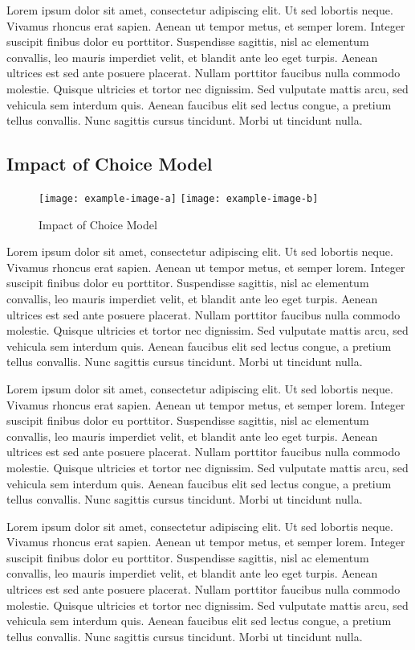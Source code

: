 Lorem ipsum dolor sit amet, consectetur adipiscing elit. Ut sed lobortis neque. Vivamus rhoncus erat sapien. Aenean ut tempor metus, et semper lorem. Integer suscipit finibus dolor eu porttitor. Suspendisse sagittis, nisl ac elementum convallis, leo mauris imperdiet velit, et blandit ante leo eget turpis. Aenean ultrices est sed ante posuere placerat. Nullam porttitor faucibus nulla commodo molestie. Quisque ultricies et tortor nec dignissim. Sed vulputate mattis arcu, sed vehicula sem interdum quis. Aenean faucibus elit sed lectus congue, a pretium tellus convallis. Nunc sagittis cursus tincidunt. Morbi ut tincidunt nulla.


\subsection{Impact of Choice Model}
\begin{figure*}
    \centering 
    \texttt{[image: example-image-a]}
    \texttt{[image: example-image-b]}

    \caption{Impact of Choice Model}
\end{figure*}


Lorem ipsum dolor sit amet, consectetur adipiscing elit. Ut sed lobortis neque. Vivamus rhoncus erat sapien. Aenean ut tempor metus, et semper lorem. Integer suscipit finibus dolor eu porttitor. Suspendisse sagittis, nisl ac elementum convallis, leo mauris imperdiet velit, et blandit ante leo eget turpis. Aenean ultrices est sed ante posuere placerat. Nullam porttitor faucibus nulla commodo molestie. Quisque ultricies et tortor nec dignissim. Sed vulputate mattis arcu, sed vehicula sem interdum quis. Aenean faucibus elit sed lectus congue, a pretium tellus convallis. Nunc sagittis cursus tincidunt. Morbi ut tincidunt nulla.

Lorem ipsum dolor sit amet, consectetur adipiscing elit. Ut sed lobortis neque. Vivamus rhoncus erat sapien. Aenean ut tempor metus, et semper lorem. Integer suscipit finibus dolor eu porttitor. Suspendisse sagittis, nisl ac elementum convallis, leo mauris imperdiet velit, et blandit ante leo eget turpis. Aenean ultrices est sed ante posuere placerat. Nullam porttitor faucibus nulla commodo molestie. Quisque ultricies et tortor nec dignissim. Sed vulputate mattis arcu, sed vehicula sem interdum quis. Aenean faucibus elit sed lectus congue, a pretium tellus convallis. Nunc sagittis cursus tincidunt. Morbi ut tincidunt nulla.

Lorem ipsum dolor sit amet, consectetur adipiscing elit. Ut sed lobortis neque. Vivamus rhoncus erat sapien. Aenean ut tempor metus, et semper lorem. Integer suscipit finibus dolor eu porttitor. Suspendisse sagittis, nisl ac elementum convallis, leo mauris imperdiet velit, et blandit ante leo eget turpis. Aenean ultrices est sed ante posuere placerat. Nullam porttitor faucibus nulla commodo molestie. Quisque ultricies et tortor nec dignissim. Sed vulputate mattis arcu, sed vehicula sem interdum quis. Aenean faucibus elit sed lectus congue, a pretium tellus convallis. Nunc sagittis cursus tincidunt. Morbi ut tincidunt nulla.

